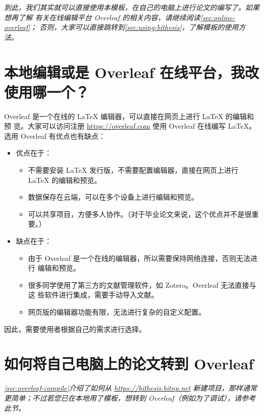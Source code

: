 \textit{
到此，我们其实就可以直接使用本模板，在自己的电脑上进行论文的编写了。如果想再了解
有关在线编辑平台 Overleaf 的相关内容，请继续阅读\autoref{sec:online-overleaf}；
否则，大家可以直接跳转到\autoref{sec:using-bithesis}，了解模板的使用方法。
}

\section{本地编辑或是 Overleaf 在线平台，我改使用哪一个？}
\label{sec:online-overleaf}

Overleaf 是一个在线的 \LaTeX{} 编辑器，可以直接在网页上进行 \LaTeX{} 的编辑和预
览。大家可以访问注册 \url{https://overleaf.com} 使用 Overleaf 在线编写
\LaTeX{}。选用 Overleaf 有优点也有缺点：
\begin{itemize}[noitemsep]
  \item 优点在于：
    \begin{itemize}[noitemsep]
      \item 不需要安装 \LaTeX{} 发行版，不需要配置编辑器，直接在网页上进行
      \LaTeX{} 的编辑和预览。
      \item 数据保存在云端，可以在多个设备上进行编辑和预览。
      \item 可以共享项目，方便多人协作。（对于毕业论文来说，这个优点并不是很重
      要。）
    \end{itemize}
  \item 缺点在于：
    \begin{itemize}[noitemsep]
      \item 由于 Overleaf 是一个在线的编辑器，所以需要保持网络连接，否则无法进行
      编辑和预览。
      \item 很多同学使用了第三方的文献管理软件，如 Zotero。Overleaf 无法直接与这
      些软件进行集成，需要手动导入文献。
      \item 网页版的编辑器功能有限，无法进行复杂的自定义配置。
    \end{itemize}
\end{itemize}

因此，需要使用者根据自己的需求进行选择。

\section{如何将自己电脑上的论文转到 Overleaf}

\textit{
\autoref{sec:overleaf-compile}介绍了如何从 \url{https://bithesis.bitnp.net} 新建项目，那样通常更简单；不过若您已在本地用了模板，想转到 Overleaf（例如为了调试），请参考此节。
}

